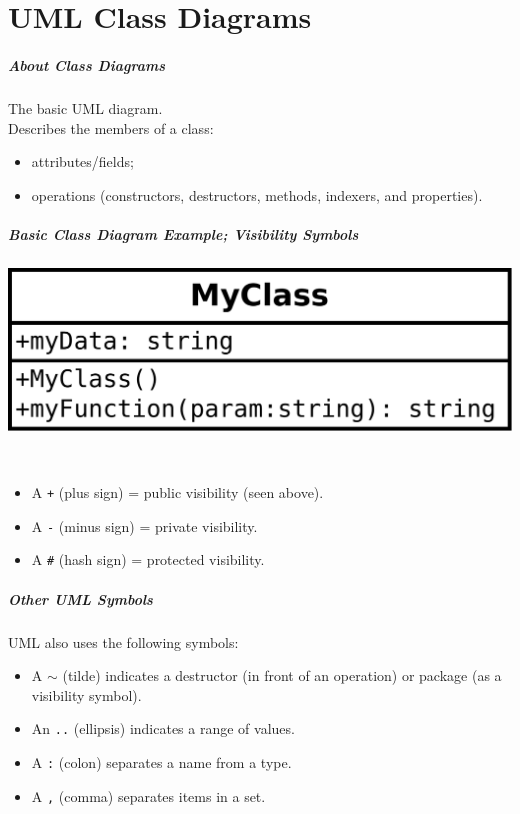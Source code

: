 \part{UML Class Diagrams}
\frame{\partpage}


\begin{frame}
\frametitle{About Class Diagrams}

\begin{changemargin}{1cm}
The basic UML diagram.\\[1em]

Describes the members of a class:
\begin{itemize}
\item attributes/fields;
\item operations (constructors,
destructors, methods, indexers, and properties).
\end{itemize}
\end{changemargin}
\end{frame}

\begin{frame}
\frametitle{Basic Class Diagram Example; Visibility Symbols}

\begin{changemargin}{1cm}
\begin{center}
\includegraphics[width=.6\textwidth]{images/myclass.pdf}
\end{center}
~\\[1em]
\begin{itemize}
\item A {\tt +} (plus sign) = public visibility (seen above).
\item A {\tt -} (minus sign) = private visibility.
\item A {\tt \#} (hash sign) = protected visibility.
\end{itemize}

\end{changemargin}
\end{frame}

\begin{frame}
\frametitle{Other UML Symbols}

\begin{changemargin}{1cm}
UML also uses the following symbols:
\begin{itemize}
\item A {\tt $\sim$} (tilde) indicates a destructor (in front of an operation) 
or package (as a visibility symbol).
\item An {\tt ..} (ellipsis) indicates a range of values.
\item A {\tt :} (colon) separates a name from a type.
\item A {\tt ,} (comma) separates items in a set.
\end{itemize}
\end{changemargin}
\end{frame}

